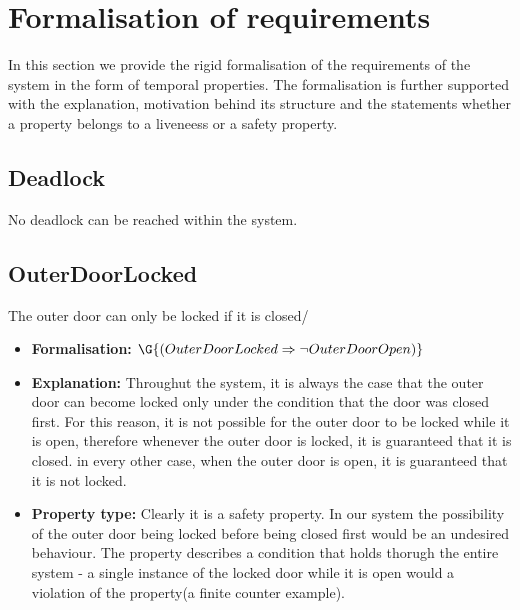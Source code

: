 \section{Formalisation of requirements}
In this section we provide the rigid formalisation of the requirements of the system in the form of temporal properties. The formalisation is further supported with the explanation, motivation behind its structure and the statements whether a property belongs to a liveneess or a safety property.
\subsection{Deadlock}
No deadlock can be reached within the system.
\subsection{OuterDoorLocked}
The outer door can only be locked if it is closed/
\begin{itemize}
	\item \textbf{Formalisation:} $\G{(OuterDoorLocked \Rightarrow \neg OuterDoorOpen)}$
	\item \textbf{Explanation:} Throughut the system, it is always the case that the outer door can become locked only under the condition that the door was closed first. For this reason, it is not possible for the outer door to be locked while it is open, therefore whenever the outer door is locked, it is guaranteed that it is closed. in every other case, when the outer door is open, it is guaranteed that it is not locked.
	\item \textbf{Property type:} Clearly it is a safety property. In our system the possibility of the outer door being locked before being closed first would be an undesired behaviour. The property describes a condition that holds thorugh the entire system - a single instance of the locked door while it is open would a violation of the property(a finite counter example).
\end{itemize}
